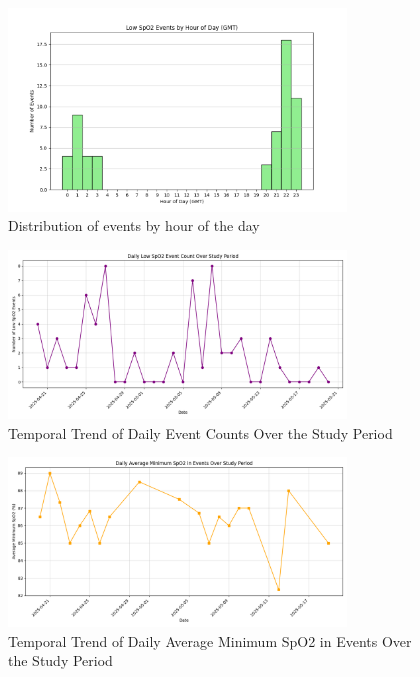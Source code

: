 \documentclass{article}
\begin{document}
\begin{figure}[htbp]
    \centering
    \includegraphics[width=0.8\textwidth]{images/_overall_events_by_hour.png}
    \caption{Distribution of events by hour of the day}
    \label{fig:hourly_dist}
\end{figure}

\begin{figure}[htbp]
    \centering
    \includegraphics[width=0.8\textwidth]{images/_temporal_event_counts.png}
    \caption{Temporal Trend of Daily Event Counts Over the Study Period}
    \label{fig:temporal_counts}
\end{figure}

\begin{figure}[htbp]
    \centering
    \includegraphics[width=0.8\textwidth]{images/_temporal_avg_min_spo2.png}
    \caption{Temporal Trend of Daily Average Minimum SpO2 in Events Over the Study Period}
    \label{fig:temporal_avg_spo2}
\end{figure}
\end{document}
